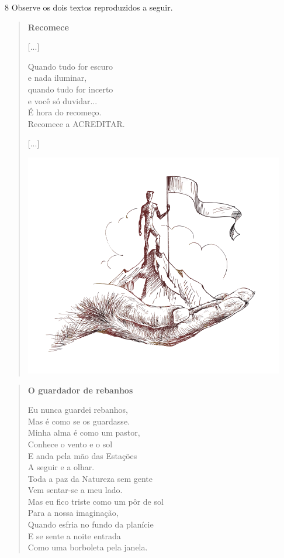 \pagebreak
\num{8} Observe os dois textos reproduzidos a seguir.

\begin{myquote}
\begin{verse}
\textbf{Recomece}

{[}...{]}

Quando tudo for escuro\\
e nada iluminar,\\
quando tudo for incerto\\
e você só duvidar...\\
É hora do recomeço.\\
Recomece a ACREDITAR.

{[}...{]}

\begin{center}
\includegraphics[width=.7\textwidth]{./media/image24b.png}
\end{center}

\end{verse}

\begin{verse}
\textbf{O guardador de rebanhos}

Eu nunca guardei rebanhos,\\
Mas é como se os guardasse.\\
Minha alma é como um pastor,\\
Conhece o vento e o sol\\
E anda pela mão das Estações\\
A seguir e a olhar.\\
Toda a paz da Natureza sem gente\\
Vem sentar-se a meu lado.\\
Mas eu fico triste como um pôr de sol\\
Para a nossa imaginação,\\
Quando esfria no fundo da planície\\
E se sente a noite entrada\\
Como uma borboleta pela janela.


\end{verse}
\end{myquote}
